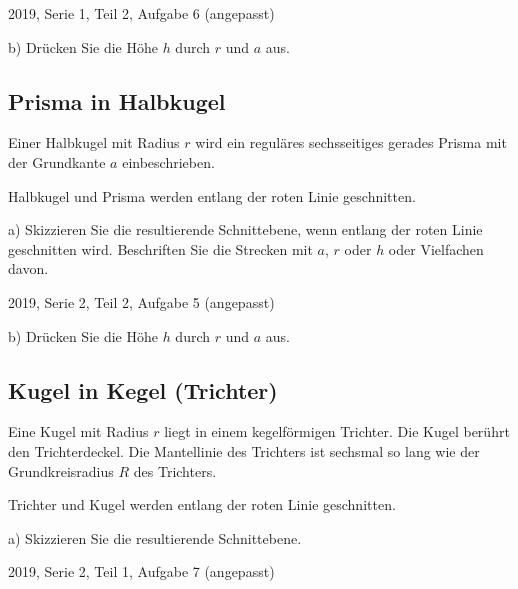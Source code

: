 {\tiny{2019, Serie 1, Teil 2, Aufgabe 6 (angepasst)}}


b) Drücken Sie die Höhe $h$ durch $r$ und $a$ aus.

\subsection{Prisma in Halbkugel}
Einer Halbkugel mit Radius $r$ wird ein reguläres sechsseitiges
gerades Prisma mit der Grundkante $a$ einbeschrieben.

Halbkugel und Prisma werden entlang der roten Linie geschnitten.

a) Skizzieren Sie die resultierende Schnittebene, wenn entlang der
roten Linie geschnitten wird. Beschriften Sie die Strecken mit $a$,
$r$ oder $h$ oder Vielfachen davon.

{\tiny{2019, Serie 2, Teil 2, Aufgabe 5 (angepasst)}}


b) Drücken Sie die Höhe $h$ durch $r$ und $a$ aus.

\subsection{Kugel in Kegel (Trichter)}

Eine Kugel mit Radius $r$ liegt in einem kegelförmigen Trichter.
Die Kugel berührt den Trichterdeckel. Die Mantellinie des Trichters
ist sechsmal so lang wie der Grundkreisradius $R$ des Trichters.

Trichter und Kugel werden entlang der roten Linie geschnitten.

a) Skizzieren Sie die resultierende Schnittebene.

{\tiny{2019, Serie 2, Teil 1, Aufgabe 7 (angepasst)}}


